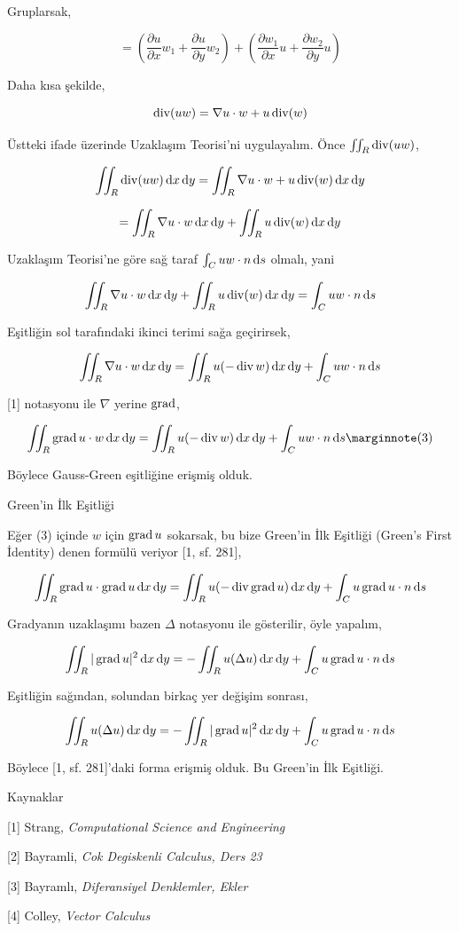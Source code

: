 \documentclass[12pt,fleqn]{article}\usepackage{../../common}
\begin{document}
Gruplarsak,

$$
= \left( 
\frac{\partial u}{\partial x} w_1 +
\frac{\partial u}{\partial y} w_2 \right) +
\left( 
\frac{\partial w_1}{\partial x} u +
\frac{\partial w_2}{\partial y} u \right)
$$

Daha kısa şekilde,

$$
\operatorname{div} (uw) = \nabla u \cdot w + u \operatorname{div}(w)
$$

Üstteki ifade üzerinde Uzaklaşım Teorisi'ni uygulayalım. Önce
$\iint_R \operatorname{div} (uw)$,

$$
\iint_R \operatorname{div} (uw) \,\mathrm{d} x \,\mathrm{d} y= \iint_R \nabla u \cdot w + u \operatorname{div}(w) \,\mathrm{d} x \,\mathrm{d} y
$$

$$
= \iint_R \nabla u \cdot w  \,\mathrm{d} x \,\mathrm{d} y + \iint_R u \operatorname{div}(w) \,\mathrm{d} x \,\mathrm{d} y
$$

Uzaklaşım Teorisi'ne göre sağ taraf $\int_C uw \cdot n \,\mathrm{d} s$ olmalı, yani

$$
\iint_R \nabla u \cdot w  \,\mathrm{d} x \,\mathrm{d} y + \iint_R u \operatorname{div}(w) \,\mathrm{d} x \,\mathrm{d} y = \int_C uw \cdot n \,\mathrm{d} s
$$

Eşitliğin sol tarafındaki ikinci terimi sağa geçirirsek,

$$
\iint_R \nabla u \cdot w  \,\mathrm{d} x \,\mathrm{d} y =
\iint_R u (-\operatorname{div} w) \,\mathrm{d} x \,\mathrm{d} y + \int_C uw \cdot n \,\mathrm{d} s
$$

[1] notasyonu ile $\nabla$ yerine $\operatorname{grad}$,

$$
\iint_R \grad u \cdot w  \ud x \ud y =
\iint_R u (-\bdiv w) \ud x \ud y + \int_C uw \cdot n \ud s
\mlabel{3}
$$

Böylece Gauss-Green eşitliğine erişmiş olduk.

Green'in İlk Eşitliği 

Eğer (3) içinde $w$ için $\operatorname{grad} u$ sokarsak, bu bize Green'in İlk Eşitliği (Green's First
İdentity) denen formülü veriyor [1, sf. 281], 

$$
\iint_R \operatorname{grad} u \cdot \operatorname{grad} u  \,\mathrm{d} x \,\mathrm{d} y =
\iint_R u (-\operatorname{div} \operatorname{grad} u) \,\mathrm{d} x \,\mathrm{d} y + \int_C u \operatorname{grad} u \cdot n \,\mathrm{d} s
$$

Gradyanın uzaklaşımı bazen $\Delta$ notasyonu ile gösterilir, öyle yapalım,

$$
\iint_R | \operatorname{grad} u |^2  \,\mathrm{d} x \,\mathrm{d} y = - \iint_R u (\Delta u) \,\mathrm{d} x \,\mathrm{d} y +
\int_C u \operatorname{grad} u \cdot n \,\mathrm{d} s
$$

Eşitliğin sağından, solundan birkaç yer değişim sonrası,

$$
\iint_R u (\Delta u) \,\mathrm{d} x \,\mathrm{d} y =
- \iint_R | \operatorname{grad} u |^2  \,\mathrm{d} x \,\mathrm{d} y
+ \int_C u \operatorname{grad} u \cdot n \,\mathrm{d} s
$$

Böylece [1, sf. 281]'daki forma erişmiş olduk. Bu Green'in İlk Eşitliği.

Kaynaklar

[1] Strang, {\em Computational Science and Engineering}

[2] Bayramli, {\em Cok Degiskenli Calculus, Ders 23}

[3] Bayramlı, {\em Diferansiyel Denklemler, Ekler}

[4] Colley, {\em Vector Calculus}
\end{document}
